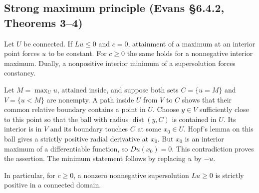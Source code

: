 \subsection{Strong maximum principle (Evans \S6.4.2, Theorems 3--4)}
\begin{theorem}\label{thm:6-strong-max}
Let $U$ be connected. If $Lu\leq0$ and $c=0$, attainment of a maximum
at an interior point forces $u$ to be constant.
For $c\geq0$ the same holds for a nonnegative interior maximum.
Dually, a nonpositive interior minimum of a supersolution forces constancy.
\end{theorem}
\begin{expandedproof}
Let $M=\max_Uu$, attained inside, and suppose both sets
$C=\{u=M\}$ and $V=\{u<M\}$ are nonempty.
A path inside $U$ from $V$ to $C$ shows that their common relative
boundary contains a point in $U$.
Choose $y\in V$ sufficiently close to this point so that the ball with
radius $\operatorname{dist}(y,C)$ is contained in $U$.
Its interior is in $V$ and its boundary touches $C$ at some $x_0\in U$.
Hopf's lemma on this ball gives a strictly positive radial derivative
at $x_0$. But $x_0$ is an interior maximum of a differentiable function,
so $Du(x_0)=0$. This contradiction proves the assertion.
The minimum statement follows by replacing $u$ by $-u$.
\end{expandedproof}
In particular, for $c\geq0$, a nonzero nonnegative supersolution
$Lu\geq0$ is strictly positive in a connected domain.

